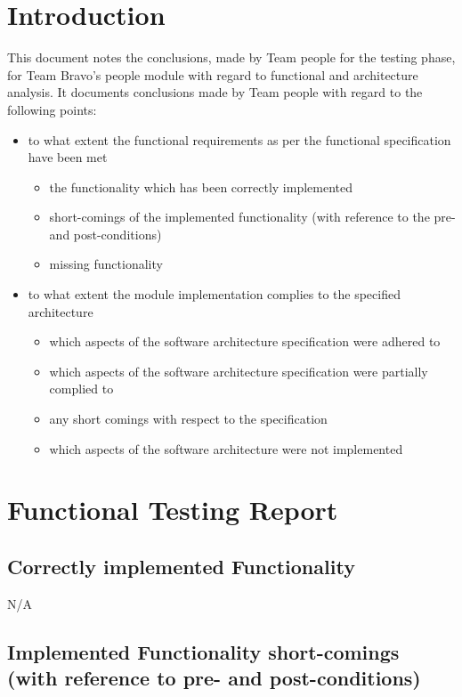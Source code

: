 \documentclass{article}
\begin{document}
	\setcounter{page}{5}
	\section{Introduction}
This document notes the conclusions, made by Team people for the testing phase, for Team Bravo's people module with regard to functional and architecture analysis. It documents conclusions made by Team people with regard to the following points:

\begin{itemize}
	\item to what extent the functional requirements as per the functional specification have been met
	\begin{itemize}
		\item the functionality which has been correctly implemented
		\item short-comings of the implemented functionality (with     reference to the pre- and post-conditions)
		\item missing functionality
	\end{itemize}
	
	\item to what extent the module implementation complies to the specified architecture
	\begin{itemize}
		\item which aspects of the software architecture specification were adhered to
		\item which aspects of the software architecture specification were partially complied to 
		\item any short comings with respect to the specification
		\item which aspects of the software architecture were not implemented
	\end{itemize}
\end{itemize}
	
	\section{Functional Testing Report}

\subsection{Correctly implemented Functionality}

N/A

\subsection{Implemented Functionality short-comings (with reference to pre- and post-conditions)}
\end{document}

